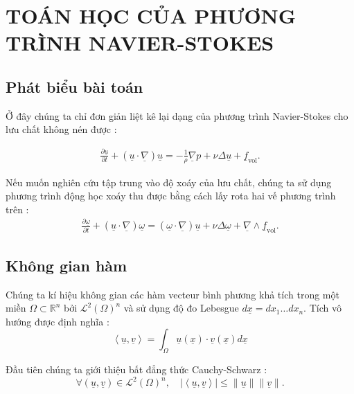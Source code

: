 \documentclass[CO_LUU_CHAT.tex]{subfiles}
\begin{document}
\appendix
	
\chapter{TOÁN HỌC CỦA PHƯƠNG TRÌNH NAVIER-STOKES}
\newpage

\section{Phát biểu bài toán}

Ở đây chúng ta chỉ đơn giản liệt kê lại dạng của phương trình Navier-Stokes cho lưu chất không nén được :

\begin{equation}
	\begin{aligned}
		\frac{\partial\underline{u}}{\partial t}+\left(\underline{u}\cdot\underline{\nabla}\right)\underline{u}=-\frac{1}{\rho}\underline{\nabla}p+\nu\Delta\underline{u}+\underline{f}_{\text{vol}}.
	\end{aligned}
\end{equation}

Nếu muốn nghiên cứu tập trung vào độ xoáy của lưu chất, chúng ta sử dụng phương trình động học xoáy thu được bằng cách lấy rota hai vế phương trình trên :
\begin{equation}
	\begin{aligned}
		\frac{\partial\underline{\omega}}{\partial t}+\left(\underline{u}\cdot\underline{\nabla}\right)\underline{\omega}=\left(\underline{\omega}\cdot\underline{\nabla}\right)\underline{u}+\nu\Delta\underline{\omega}+\underline{\nabla}\wedge\underline{f}_{\text{vol}}.
	\end{aligned}
\end{equation}

\section{Không gian hàm}

Chúng ta kí hiệu không gian các hàm vecteur bình phương khả tích trong một miền $\Omega\subset\mathbb{R}^n$ bởi $\mathcal{L}^2(\Omega)^n$ và sử dụng độ đo Lebesgue $d\underline{x}=dx_1\dots dx_n$. Tích vô hướng được định nghĩa :
\[
\left\langle {\underline{u},\underline{v}} \right\rangle  = \int_\Omega  {\underline{u}\left( {\underline x } \right)\cdot\underline{v}\left( {\underline x } \right)d\underline x }
\]

Đầu tiên chúng ta giới thiệu bất đẳng thức Cauchy-Schwarz :
\[
\forall\left(\underline{u},\underline{v}\right)\in\mathcal{L}^2(\Omega)^n,\quad|\left\langle\underline{u},\underline{v}\right\rangle|\le\|\underline{u}\|\|\underline{v}\|.
\]
\end{document}

